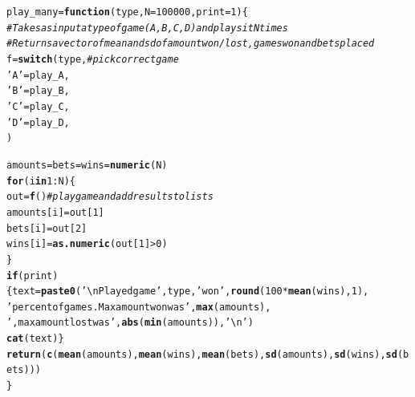 \documentclass[12pt]{article}\usepackage[]{graphicx}\usepackage[]{color}
\makeatletter
\newcommand{\hlnum}[1]{\textcolor[rgb]{0.686,0.059,0.569}{#1}}%
\newcommand{\hlstr}[1]{\textcolor[rgb]{0.192,0.494,0.8}{#1}}%
\newcommand{\hlcom}[1]{\textcolor[rgb]{0.678,0.584,0.686}{\textit{#1}}}%
\newcommand{\hlopt}[1]{\textcolor[rgb]{0,0,0}{#1}}%
\newcommand{\hlstd}[1]{\textcolor[rgb]{0.345,0.345,0.345}{#1}}%
\newcommand{\hlkwa}[1]{\textcolor[rgb]{0.161,0.373,0.58}{\textbf{#1}}}%
\newcommand{\hlkwb}[1]{\textcolor[rgb]{0.69,0.353,0.396}{#1}}%
\newcommand{\hlkwc}[1]{\textcolor[rgb]{0.333,0.667,0.333}{#1}}%
\newcommand{\hlkwd}[1]{\textcolor[rgb]{0.737,0.353,0.396}{\textbf{#1}}}%
\newenvironment{kframe}{%
 \def\at@end@of@kframe{}%
 \ifinner\ifhmode%
  \def\at@end@of@kframe{\end{minipage}}%
  \begin{minipage}{\columnwidth}%
 \fi\fi%
 \def\FrameCommand##1{\hskip\@totalleftmargin \hskip-\fboxsep
 \colorbox{shadecolor}{##1}\hskip-\fboxsep
     \hskip-\linewidth \hskip-\@totalleftmargin \hskip\columnwidth}%
 \MakeFramed {\advance\hsize-\width
   \@totalleftmargin\z@ \linewidth\hsize
   \@setminipage}}%
 {\par\unskip\endMakeFramed%
 \at@end@of@kframe}
\newenvironment{knitrout}{}{} %
\makeatother
\begin{document}
\begin{knitrout}
\color{fgcolor}\begin{kframe}
\begin{alltt}
\hlstd{play_many} \hlkwb{=} \hlkwa{function}\hlstd{(}\hlkwc{type}\hlstd{,} \hlkwc{N}\hlstd{=}\hlnum{100000}\hlstd{,} \hlkwc{print}\hlstd{=}\hlnum{1}\hlstd{)\{}
  \hlcom{#Takes as input a type of game (A,B,C,D) and plays it N times}
  \hlcom{#Returns a vector of mean and sd of amount won/lost, games won and bets placed}
  \hlstd{f} \hlkwb{=} \hlkwd{switch}\hlstd{(type,} \hlcom{#pick correct game}
         \hlstr{'A'} \hlstd{= play_A,}
         \hlstr{'B'} \hlstd{= play_B,}
         \hlstr{'C'} \hlstd{= play_C,}
         \hlstr{'D'} \hlstd{= play_D,}
         \hlstd{)}

  \hlstd{amounts} \hlkwb{=} \hlstd{bets} \hlkwb{=} \hlstd{wins} \hlkwb{=} \hlkwd{numeric}\hlstd{(N)}
  \hlkwa{for} \hlstd{(i} \hlkwa{in} \hlnum{1}\hlopt{:}\hlstd{N)\{}
    \hlstd{out} \hlkwb{=} \hlkwd{f}\hlstd{()} \hlcom{#play game and add results to lists}
    \hlstd{amounts[i]}\hlkwb{=}\hlstd{out[}\hlnum{1}\hlstd{]}
    \hlstd{bets[i]}\hlkwb{=}\hlstd{out[}\hlnum{2}\hlstd{]}
    \hlstd{wins[i]} \hlkwb{=} \hlkwd{as.numeric}\hlstd{( out[}\hlnum{1}\hlstd{]} \hlopt{>} \hlnum{0} \hlstd{)}
  \hlstd{\}}
  \hlkwa{if} \hlstd{(print)\{text} \hlkwb{=} \hlkwd{paste0}\hlstd{(}\hlstr{'\textbackslash{}nPlayed game '}\hlstd{, type,} \hlstr{' won '}\hlstd{,} \hlkwd{round}\hlstd{(}\hlnum{100}\hlopt{*}\hlkwd{mean}\hlstd{(wins),}\hlnum{1}\hlstd{),}
                          \hlstr{' percent of games. Max amount won was '}\hlstd{,} \hlkwd{max}\hlstd{(amounts),}
                          \hlstr{', max amount lost was '}\hlstd{,} \hlkwd{abs}\hlstd{(}\hlkwd{min}\hlstd{(amounts)),} \hlstr{'\textbackslash{}n'}\hlstd{)}
              \hlkwd{cat}\hlstd{(text)\}}
  \hlkwd{return}\hlstd{(}\hlkwd{c}\hlstd{(}\hlkwd{mean}\hlstd{(amounts),} \hlkwd{mean}\hlstd{(wins),} \hlkwd{mean}\hlstd{(bets),} \hlkwd{sd}\hlstd{(amounts),} \hlkwd{sd}\hlstd{(wins),} \hlkwd{sd}\hlstd{(bets)))}
\hlstd{\}}


\end{alltt}
\end{kframe}
\end{knitrout}
\end{document}
